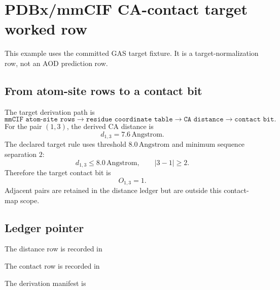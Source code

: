 \section{PDBx/mmCIF CA-contact target worked row}

This example uses the committed GAS target fixture. It is a target-normalization row, not an AOD prediction row.

\subsection{From atom-site rows to a contact bit}

The target derivation path is
\[
\texttt{mmCIF atom-site rows}
\to
\texttt{residue coordinate table}
\to
\texttt{CA distance}
\to
\texttt{contact bit}.
\]
For the pair $(1,3)$, the derived CA distance is
\[
 d_{1,3}=7.6\,\text{Angstrom}.
\]
The declared target rule uses threshold $8.0\,\text{Angstrom}$ and minimum sequence separation $2$:
\[
 d_{1,3}\le 8.0\,\text{Angstrom},
\qquad
 |3-1|\ge 2.
\]
Therefore the target contact bit is
\[
\boxed{O_{1,3}=1.}
\]
Adjacent pairs are retained in the distance ledger but are outside this contact-map scope.

\subsection{Ledger pointer}

The distance row is recorded in
\begin{center}
\small{}
\end{center}
The contact row is recorded in
\begin{center}
\small{}
\end{center}
The derivation manifest is
\begin{center}
\small{}
\end{center}

